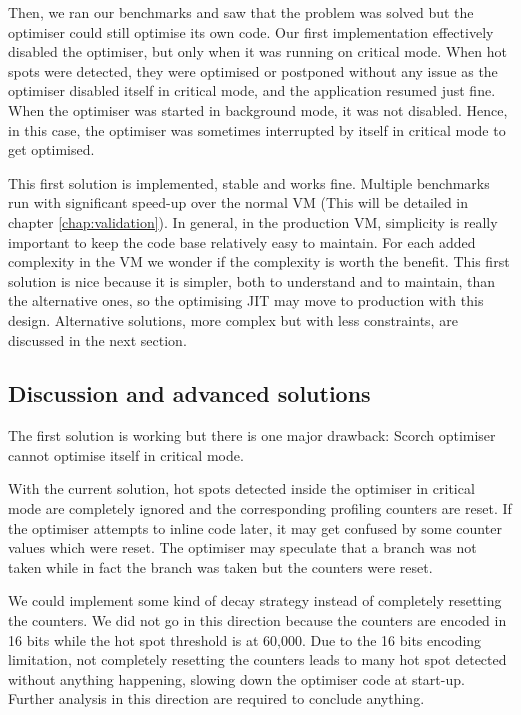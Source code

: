 \documentclass[a4paper,12pt,twoside]{../includes/ThesisStyle}
\begin{document}
Then, we ran our benchmarks and saw that the problem was solved but the optimiser could still optimise its own code. Our first implementation effectively disabled the optimiser, but only when it was running on critical mode. When hot spots were detected, they were optimised or postponed without any issue as the optimiser disabled itself in critical mode, and the application resumed just fine. When the optimiser was started in background mode, it was not disabled. Hence, in this case, the optimiser was sometimes interrupted by itself in critical mode to get optimised.

This first solution is implemented, stable and works fine. Multiple benchmarks run with significant speed-up over the normal VM (This will be detailed in chapter \ref{chap:validation}). In general, in the production VM, simplicity is really important to keep the code base relatively easy to maintain. For each added complexity in the VM we wonder if the complexity is worth the benefit. This first solution is nice because it is simpler, both to understand and to maintain, than the alternative ones, so the optimising JIT may move to production with this design. Alternative solutions, more complex but with less constraints, are discussed in the next section.

\subsection{Discussion and advanced solutions}

The first solution is working but there is one major drawback: Scorch optimiser cannot optimise itself in critical mode. 

With the current solution, hot spots detected inside the optimiser in critical mode are completely ignored and the corresponding profiling counters are reset. If the optimiser attempts to inline code later, it may get confused by some counter values which were reset. The optimiser may speculate that a branch was not taken while in fact the branch was taken but the counters were reset. 

We could implement some kind of decay strategy instead of completely resetting the counters. We did not go in this direction because the counters are encoded in 16 bits while the hot spot threshold is at 60,000. Due to the 16 bits encoding limitation, not completely resetting the counters leads to many hot spot detected without anything happening, slowing down the optimiser code at start-up. Further analysis in this direction are required to conclude anything.
\end{document}
